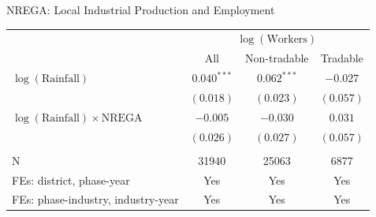 \begin{frame}{NREGA: Local Industrial Production and Employment}
{\begin{table}[h!]
\begin{center}
\begin{tabular}{lccc}
                 & \multicolumn{3}{c}{$\log(\text{Workers})$} \\ \cline{2-4}
                 & All & Non-tradable & Tradable \\
                \hline
                $\log(\text{Rainfall})$ & \textcolor{citrine}{$0.040^{***}$} & \textcolor{citrine}{$0.062^{***}$} & \textcolor{citrine}{$-0.027$}\\
                 & $(0.018)$ & $(0.023)$& $(0.057)$ \\
                 $\log(\text{Rainfall})\times\text{NREGA}$ & \textcolor{citrine}{$-0.005$} & \textcolor{citrine}{$-0.030$} & \textcolor{citrine}{$0.031$}\\
                 & $(0.026)$ & $(0.027)$& $(0.057)$ \\
                 &\\
                 N & 31940 & 25063 & 6877 \\
                 FEs: district, phase-year & Yes & Yes & Yes\\
                 FEs: phase-industry, industry-year  & Yes & Yes & Yes
                \end{tabular}
            \end{center}
        \end{table}
    }

 \end{frame}

